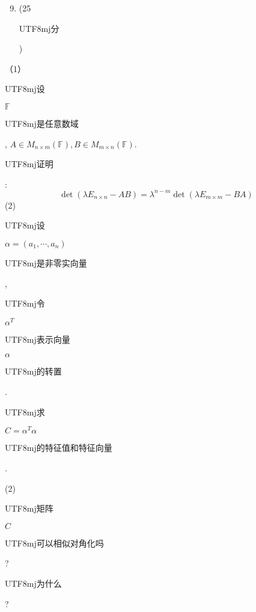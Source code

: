 \documentclass[10pt]{article}
\begin{document}
\begin{enumerate}
  \setcounter{enumi}{8}
  \item (25 \begin{CJK}{UTF8}{mj}分\end{CJK})
\end{enumerate}
（1）\begin{CJK}{UTF8}{mj}设\end{CJK} $\mathbb{F}$ \begin{CJK}{UTF8}{mj}是任意数域\end{CJK}, $A \in M_{n \times m}(\mathbb{F}), B \in M_{m \times n}(\mathbb{F})$. \begin{CJK}{UTF8}{mj}证明\end{CJK}:
$$
\operatorname{det}\left(\lambda E_{n \times n}-A B\right)=\lambda^{n-m} \operatorname{det}\left(\lambda E_{m \times m}-B A\right)
$$
(2) \begin{CJK}{UTF8}{mj}设\end{CJK} $\alpha=\left(a_{1}, \cdots, a_{n}\right)$ \begin{CJK}{UTF8}{mj}是非零实向量\end{CJK}, \begin{CJK}{UTF8}{mj}令\end{CJK} $\alpha^{T}$ \begin{CJK}{UTF8}{mj}表示向量\end{CJK} $\alpha$ \begin{CJK}{UTF8}{mj}的转置\end{CJK}. \begin{CJK}{UTF8}{mj}求\end{CJK} $C=\alpha^{T} \alpha$ \begin{CJK}{UTF8}{mj}的特征值和特征向量\end{CJK}.

(2) \begin{CJK}{UTF8}{mj}矩阵\end{CJK} $C$ \begin{CJK}{UTF8}{mj}可以相似对角化吗\end{CJK}? \begin{CJK}{UTF8}{mj}为什么\end{CJK}?
\end{document}
